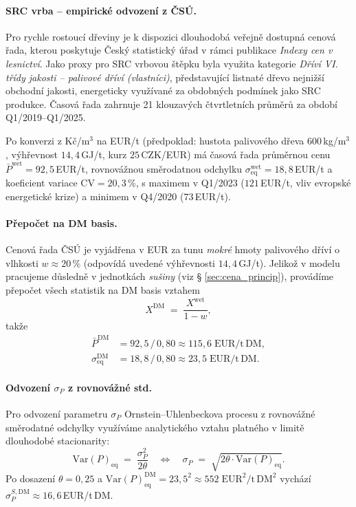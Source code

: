 \paragraph{SRC vrba -- empirické odvození z ČSÚ.}
Pro rychle rostoucí dřeviny je k dispozici dlouhodobá veřejně dostupná 
cenová řada, kterou poskytuje Český statistický úřad 
\citep{CSU2025LesnictviI} v rámci publikace \emph{Indexy cen v lesnictví}. 
Jako proxy pro SRC vrbovou štěpku byla využita kategorie 
\emph{Dříví VI. třídy jakosti -- palivové dříví (vlastníci)}, představující 
listnaté dřevo nejnižší obchodní jakosti, energeticky využívané za obdobných 
podmínek jako SRC produkce. Časová řada zahrnuje 21 klouzavých čtvrtletních 
průměrů za období Q1/2019--Q1/2025.

Po konverzi z Kč/m$^3$ na EUR/t (předpoklad: hustota palivového dřeva 
$600\,$kg/m$^3$, výhřevnost $14{,}4\,$GJ/t, kurz $25\,$CZK/EUR) má časová 
řada průměrnou cenu $\bar{P}^{\mathrm{wet}} = 92{,}5\,$EUR/t, rovnovážnou 
směrodatnou odchylku $\sigma_\mathrm{eq}^{\mathrm{wet}} = 18{,}8\,$EUR/t a 
koeficient variace $\mathrm{CV} = 20{,}3\,\%$, s maximem v Q1/2023 
($121\,$EUR/t, vliv evropské energetické krize) a minimem v Q4/2020 
($73\,$EUR/t).

\paragraph{Přepočet na DM basis.}
Cenová řada ČSÚ je vyjádřena v EUR za tunu \emph{mokré} hmoty palivového 
dříví o vlhkosti $w \approx 20\,\%$ (odpovídá uvedené výhřevnosti 
$14{,}4\,$GJ/t). Jelikož v modelu pracujeme důsledně v jednotkách 
\emph{sušiny} (viz § \ref{sec:cena_princip}), provádíme přepočet všech 
statistik na DM basis vztahem
\begin{equation}
X^{\mathrm{DM}} \;=\; \frac{X^{\mathrm{wet}}}{1 - w},
\label{eq:dm_konverze}
\end{equation}
takže
\begin{align}
\bar{P}^{\mathrm{DM}}              &= 92{,}5 \,/\, 0{,}80 \approx 115{,}6 \;\mathrm{EUR/t\,DM}, \\
\sigma_\mathrm{eq}^{\mathrm{DM}}   &= 18{,}8 \,/\, 0{,}80 \approx 23{,}5 \;\mathrm{EUR/t\,DM}.
\end{align}


\paragraph{Odvození $\sigma_P$ z rovnovážné std.}
Pro odvození parametru $\sigma_P$ Ornstein--Uhlenbeckova procesu z 
rovnovážné směrodatné odchylky využíváme analytického vztahu platného 
v limitě dlouhodobé stacionarity:
\begin{equation}
\mathrm{Var}(P)_\mathrm{eq} \;=\; \frac{\sigma_P^2}{2\theta} 
\quad\Longleftrightarrow\quad 
\sigma_P \;=\; \sqrt{2\theta \cdot \mathrm{Var}(P)_\mathrm{eq}}.
\label{eq:OU_sigma_eq}
\end{equation}
Po dosazení $\theta = 0{,}25$ a 
$\mathrm{Var}(P)_\mathrm{eq}^{\mathrm{DM}} = 23{,}5^2 \approx 552\;\mathrm{EUR}^2/\mathrm{t\,DM}^2$ 
vychází $\sigma_P^{S,\mathrm{DM}} \approx 16{,}6\,$EUR/t\,DM. 
